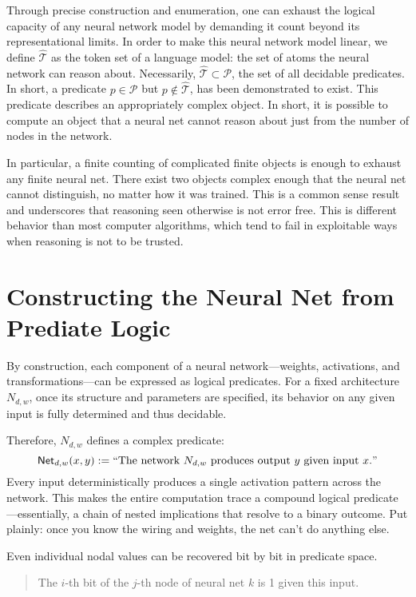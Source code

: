 \documentclass[12pt]{article}
\theoremstyle{plain}
\begin{document}
Through precise construction and enumeration, one can exhaust the logical capacity
of any neural network model by demanding it count beyond its representational limits.
In order to make this neural network model linear, we define $\hat{\mathcal{T}}$ as 
the token set of a language model: the set of atoms the neural network can reason about. 
Necessarily,
$\hat{\mathcal{T}}\subset \mathcal{P}$, the set of all decidable predicates.  In short,
a predicate $p\in \mathcal{P}$ but $p \notin \hat{\mathcal{T}}$, has been
demonstrated to exist.  This predicate describes an appropriately complex object. 
In short, it is possible to compute an object that a neural net cannot reason about
just from the number of nodes in the network.

In particular, a finite counting of complicated finite objects is enough to exhaust
any finite neural net.  There exist two objects complex enough that the neural net
cannot distinguish, no matter how it was trained.  This is a common sense result
and underscores that reasoning seen otherwise is not error free.  This is
different behavior than most computer algorithms, which tend to fail in 
exploitable ways when reasoning is not to be trusted.

\section{Constructing the Neural Net from Prediate Logic}

By construction, each component of a neural network---weights, 
activations, and transformations---can be expressed as logical 
predicates. For a fixed architecture $N_{d,w}$, once its 
structure and parameters are specified, its behavior on any 
given input is fully determined and thus decidable.

Therefore, $N_{d,w}$ defines a complex predicate:
$$
    \mathsf{Net}_{d,w}(x, y) := \text{``The network } N_{d,w} \text{ produces output } y \text{ given input } x." 
$$
Every input deterministically produces a single activation 
pattern across the network. This makes the entire computation 
trace a compound logical predicate---essentially, a chain of 
nested implications that resolve to a binary outcome. Put 
plainly: once you know the wiring and weights, the net can’t 
do anything else.

Even individual nodal values can be recovered bit by bit in
predicate space.
\begin{quote}
    The $i$-th bit of the $j$-th node of neural net $k$ is 1 given this input.
\end{quote}
\end{document}
